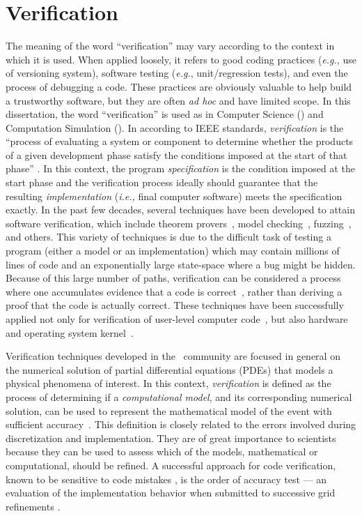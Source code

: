 \section{Verification}

The meaning of the word ``verification'' may vary according to the context in which it is used. When applied loosely, it refers to good coding practices
({\em e.g.}, use of versioning system), software testing ({\em e.g.}, unit/regression tests), and even the process of debugging a code. These practices are obviously valuable to help build a trustworthy software, but they are often \emph{ad hoc} and have limited scope. 
In this dissertation, the word ``verification'' is used as in Computer Science (\cs) and Computation Simulation (\cse). 
In \cs{} according to IEEE standards, 
\emph{verification} is the ``process of evaluating a 
system or component to determine whether the products of a given 
development phase satisfy the conditions imposed at the start of
that phase'' \cite{159342}.
%
In this context, the program \emph{specification} is the condition
imposed at the start phase and the verification process
ideally should guarantee that the resulting \emph{implementation}
({\em i.e.,} final computer software) meets the 
specification exactly. 
%
In the past
few decades, several techniques have been developed
to attain software verification, which include theorem
provers~\cite{Bowen95}, 
model checking~\cite{Clarke08},
fuzzing~\cite{bird83, godefroid08},  and others. This variety of
techniques is due to the difficult task of testing a program (either
a model or an implementation) which may contain millions of lines
of code and an exponentially large state-space where a
bug might be 
hidden. Because of this large number of paths,
verification can be considered a
process where one accumulates evidence that a code is
correct~\cite{roach98}, rather than deriving a proof that the code is actually correct.
These techniques have been successfully applied not only for
verification of 
user-level computer code~\cite{1646374}, but also
hardware~\cite{seger92} and  
operating system kernel~\cite{1629596}. 

Verification techniques developed in the \cse~community are focused in general on the
numerical solution of partial differential equations (PDEs) that 
models a physical phenomena of
interest. In this context, 
\emph{verification} is defined as the process of determining if a
\emph{computational model}, and its corresponding numerical solution,   
can be used to represent the mathematical model of the event with 
sufficient accuracy~\cite{babuska04}.
%
This definition is closely related to the errors involved during
discretization and implementation. They are of great importance to
scientists because they can be used to assess which of the models,
mathematical or computational, should be refined.  A successful
approach for code verification, known to be sensitive to code
mistakes \cite{roach98}, is the order of accuracy test --- an
evaluation of the implementation behavior when submitted to successive
grid refinements \cite{roach98}. 

